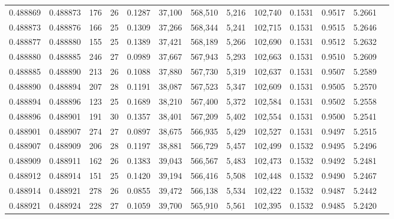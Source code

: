 \begin{tabular}{rrrrrrrrrrrrr}
0.488869 & 0.488873 & 176 &  26 &                                     0.1287 &  37,100 & 568,510 &   5,216 & 102,740 & 0.1531 & 0.9517 & 5.2661 \\
0.488873 & 0.488876 & 166 &  25 &                                     0.1309 &  37,266 & 568,344 &   5,241 & 102,715 & 0.1531 & 0.9515 & 5.2646 \\
0.488877 & 0.488880 & 155 &  25 &                                     0.1389 &  37,421 & 568,189 &   5,266 & 102,690 & 0.1531 & 0.9512 & 5.2632 \\
0.488880 & 0.488885 & 246 &  27 &                                     0.0989 &  37,667 & 567,943 &   5,293 & 102,663 & 0.1531 & 0.9510 & 5.2609 \\
0.488885 & 0.488890 & 213 &  26 &                                     0.1088 &  37,880 & 567,730 &   5,319 & 102,637 & 0.1531 & 0.9507 & 5.2589 \\
0.488890 & 0.488894 & 207 &  28 &                                     0.1191 &  38,087 & 567,523 &   5,347 & 102,609 & 0.1531 & 0.9505 & 5.2570 \\
0.488894 & 0.488896 & 123 &  25 &                                     0.1689 &  38,210 & 567,400 &   5,372 & 102,584 & 0.1531 & 0.9502 & 5.2558 \\
0.488896 & 0.488901 & 191 &  30 &                                     0.1357 &  38,401 & 567,209 &   5,402 & 102,554 & 0.1531 & 0.9500 & 5.2541 \\
0.488901 & 0.488907 & 274 &  27 &                                     0.0897 &  38,675 & 566,935 &   5,429 & 102,527 & 0.1531 & 0.9497 & 5.2515 \\
0.488907 & 0.488909 & 206 &  28 &                                     0.1197 &  38,881 & 566,729 &   5,457 & 102,499 & 0.1532 & 0.9495 & 5.2496 \\
0.488909 & 0.488911 & 162 &  26 &                                     0.1383 &  39,043 & 566,567 &   5,483 & 102,473 & 0.1532 & 0.9492 & 5.2481 \\
0.488912 & 0.488914 & 151 &  25 &                                     0.1420 &  39,194 & 566,416 &   5,508 & 102,448 & 0.1532 & 0.9490 & 5.2467 \\
0.488914 & 0.488921 & 278 &  26 &                                     0.0855 &  39,472 & 566,138 &   5,534 & 102,422 & 0.1532 & 0.9487 & 5.2442 \\
0.488921 & 0.488924 & 228 &  27 &                                     0.1059 &  39,700 & 565,910 &   5,561 & 102,395 & 0.1532 & 0.9485 & 5.2420 \\

\end{tabular}
